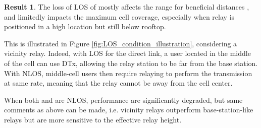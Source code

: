 \documentclass[journal]{IEEEtran}
\theoremstyle{definition}
\newtheorem{result}{Result}
\begin{document}
\vspace*{-5pt}\begin{result}
The loss of LOS of  mostly affects the range for beneficial distances , and limitedly impacts the maximum cell coverage, especially when relay is positioned in a high location but still below rooftop.
\end{result} \vspace*{-5pt} \noindent
This is illustrated in Figure \ref{fig:LOS_condition_illustration}, considering a vicinity relay.
Indeed, with LOS for the direct link, a user located in the middle of the cell can use DTx, allowing the relay station to be far from the base station. With  NLOS, middle-cell users then require relaying to perform the transmission at same rate, meaning that the relay cannot be away from the cell center. 


When both  and  are NLOS, performance are significantly degraded, but same comments as above can be made, i.e. vicinity relays outperform base-station-like relays but are more sensitive to the effective relay height.
\end{document}
